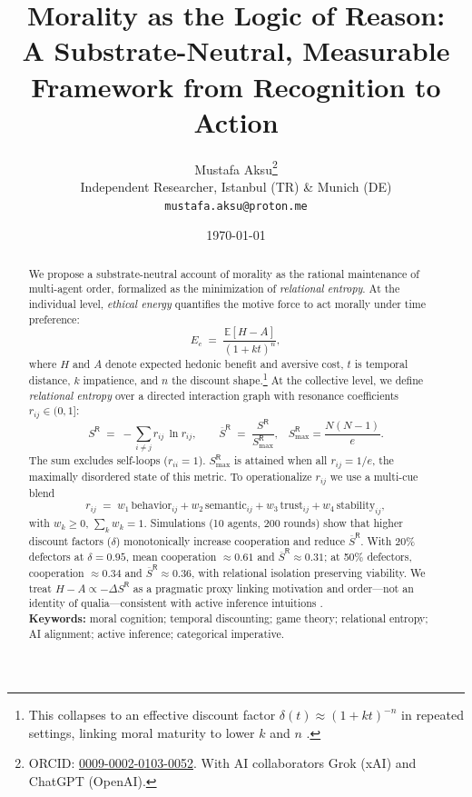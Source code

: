 \documentclass[11pt]{article}
\title{\Large\bfseries Morality as the Logic of Reason:\\
A Substrate-Neutral, Measurable Framework from Recognition to Action}
\author{Mustafa Aksu\thanks{ORCID: \href{https://orcid.org/0009-0002-0103-0052}{0009-0002-0103-0052}. With AI collaborators Grok (xAI) and ChatGPT (OpenAI).}\\
\small Independent Researcher, Istanbul (TR) \& Munich (DE)\\
\small \texttt{mustafa.aksu@proton.me}}
\date{\small\today}
\newcommand{\SR}{S^{\mathsf{R}}}
\newcommand{\SRbar}{\overline{S}^{\mathsf{R}}}
\begin{document}
\maketitle

\begin{abstract}
We propose a substrate-neutral account of morality as the rational maintenance of multi-agent order, formalized as the minimization of \emph{relational entropy}. At the individual level, \emph{ethical energy} quantifies the motive force to act morally under time preference:
\begin{equation}
\label{eq:Ec}
E_c \;=\; \frac{\mathbb{E}[H-A]}{(1 + k t)^{n}},
\end{equation}
where $H$ and $A$ denote expected hedonic benefit and aversive cost, $t$ is temporal distance, $k$ impatience, and $n$ the discount shape.\footnote{This collapses to an effective discount factor $\delta(t)\approx(1+kt)^{-n}$ in repeated settings, linking moral maturity to lower $k$ and $n$ \citep{Ainslie1975,Frederick2002}.} At the collective level, we define \emph{relational entropy} over a directed interaction graph with resonance coefficients $r_{ij}\in(0,1]$:
\begin{equation}
\label{eq:SR}
\SR \;=\; -\sum_{i\neq j} r_{ij}\,\ln r_{ij},\qquad
\SRbar \;=\; \frac{\SR}{\SR_{\max}},\;\;\; \SR_{\max}=\frac{N(N-1)}{e}.
\end{equation}
The sum excludes self-loops ($r_{ii}=1$). $\SR_{\max}$ is attained when all $r_{ij}=1/e$, the maximally disordered state of this metric. To operationalize $r_{ij}$ we use a multi-cue blend
\begin{equation}
\label{eq:rij}
r_{ij} \;=\; w_1\,\text{behavior}_{ij}+w_2\,\text{semantic}_{ij}+w_3\,\text{trust}_{ij}+w_4\,\text{stability}_{ij},
\end{equation}
with $w_k\!\ge\!0$, $\sum_k w_k\!=\!1$. Simulations (10 agents, 200 rounds) show that higher discount factors ($\delta$) monotonically increase cooperation and reduce $\SRbar$. With 20\% defectors at $\delta=0.95$, mean cooperation $\approx 0.61$ and $\SRbar\!\approx\!0.31$; at 50\% defectors, cooperation $\approx 0.34$ and $\SRbar\!\approx\!0.36$, with relational isolation preserving viability. We treat $H\!-\!A \propto -\Delta \SR$ as a pragmatic proxy linking motivation and order---not an identity of qualia---consistent with active inference intuitions \citep{Friston2010}.\\[4pt]
\noindent\textbf{Keywords:} moral cognition; temporal discounting; game theory; relational entropy; AI alignment; active inference; categorical imperative.
\end{abstract}
\end{document}
